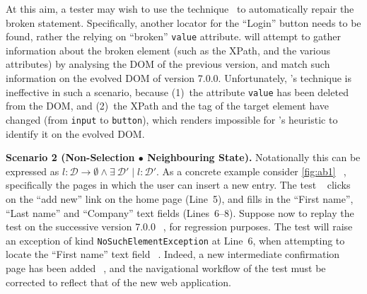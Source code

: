 At this aim, a tester may wish to use the \water  technique~\cite{Choudhary:2011:WWA:2002931.2002935} to automatically repair the broken statement. Specifically, another locator for the ``Login'' button needs to be found, rather the relying on ``broken'' \texttt{value} attribute. \water will attempt to gather information about the broken element (such as the XPath, and the various attributes) by analysing the DOM of the previous version, and match such information on the evolved DOM of version 7.0.0. Unfortunately, \water's technique is ineffective in such a scenario, because (1)~the attribute \texttt{value} has been deleted from the DOM, and (2)~the XPath and the tag of the target element have changed (from \mbox{\texttt{input}} to \mbox{\texttt{button}}), which renders impossible for \water's heuristic to identify it on the evolved DOM. 
 

\noindent
\textbf{Scenario 2 (Non-Selection $\bullet$ Neighbouring State).}
Notationally this can be expressed as $l: \mathcal{D} \rightarrow \emptyset \land \exists \ \mathcal{D'} \mid l: \mathcal{D'}$.
As a concrete example consider \autoref{fig:ab1}~\textcircled{}, %
specifically the pages in which the user can insert a new entry. The test~\textcircled{} clicks on the ``add new'' link on the home page (Line~5), and fills in the ``First name'', ``Last name'' and ``Company'' text fields (Lines~6--8).
Suppose now to replay the test on the successive version 7.0.0~\textcircled{}, for regression purposes. The test will raise an exception of kind \texttt{NoSuchElementException} at Line~6, when attempting to locate the ``First name'' text field~\textcircled{}. 
Indeed, a new intermediate confirmation page has been added~\textcircled{}, and the navigational workflow of the test must be corrected to reflect that of the new  web application.

